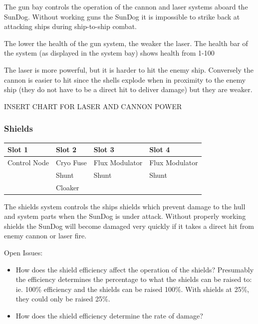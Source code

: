 \begin{itemize}
The gun bay controls the operation of the cannon and laser systems aboard
the SunDog.  Without working guns the SunDog it is impossible to strike
back at attacking ships during ship-to-ship combat.

The lower the health of the gun system, the weaker the laser. The health bar of the system (as displayed in the system bay) shows health from 1-100%

The laser is more powerful, but it is harder to hit the enemy ship. Conversely the cannon is easier to hit since the shells explode when in proximity to the enemy ship (they do not have to be a direct hit to deliver damage) but they are weaker. 


INSERT CHART FOR LASER AND CANNON POWER


\subsubsection{Shields}

\begin{tabular}{ | p{2.5cm} | p{2.5cm} | p{2.5cm} | p{2.5cm} | }
\hline
Slot 1 & Slot 2 & Slot 3 & Slot 4 \\ \hline
Control Node & Cryo Fuse & Flux Modulator & Flux Modulator \\
& Shunt & Shunt & Shunt \\
& Cloaker & & \\
\hline
\end{tabular}

The shields system controls the ships shields which prevent damage to
the hull and system parts when the SunDog is under attack.  Without
properly working shields the SunDog will become damaged very quickly
if it takes a direct hit from enemy cannon or laser fire.

Open Issues:
\begin{itemize}
\item How does the shield efficiency affect the operation of the shields?
Presumably the efficiency determines the percentage to what the shields can
be raised to:  ie. 100\% efficiency and the shields can be raised 100\%.
With shields at 25\%, they could only be raised 25\%.
\item How does the shield efficiency determine the rate of damage?
\end{itemize}


\end{itemize}
